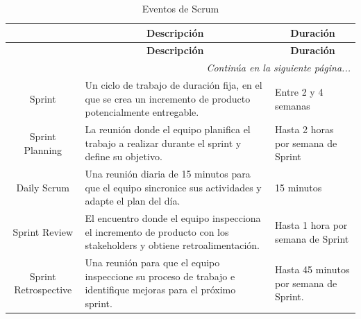 \begin{longtable}[c]{|c|m{}|m{}|}
    \caption{Eventos de Scrum}
    \label{tab:eventos} \\
    \hline
    \rowcolor{gray!50}
    \multicolumn{1}{|c|}{\textbf{Evento}} & \multicolumn{1}{c|}{\textbf{Descripción}} & \multicolumn{1}{c|}{\textbf{Duración}} \\
    \hline
    \endfirsthead

    \hline
    \rowcolor{gray!50}
    \multicolumn{1}{|c|}{\textbf{Evento}} & \multicolumn{1}{c|}{\textbf{Descripción}} & \multicolumn{1}{c|}{\textbf{Duración}} \\
    \hline
    \endhead

    \multicolumn{3}{r}{\textit{Continúa en la siguiente página...}} \\
    \endfoot

    \endlastfoot


    Sprint & Un ciclo de trabajo de duración fija, en el que se crea un incremento de producto potencialmente entregable. & Entre 2 y 4 semanas \\
    \hline
    Sprint Planning & La reunión donde el equipo planifica el trabajo a realizar durante el sprint y define su objetivo. & Hasta 2 horas por semana de Sprint \\
    \hline
    Daily Scrum & Una reunión diaria de 15 minutos para que el equipo sincronice sus actividades y adapte el plan del día. & 15 minutos \\
    \hline
    Sprint Review & El encuentro donde el equipo inspecciona el incremento de producto con los stakeholders y obtiene retroalimentación. & Hasta 1 hora por semana de Sprint \\
    \hline
    Sprint Retrospective & Una reunión para que el equipo inspeccione su proceso de trabajo e identifique mejoras para el próximo sprint. & Hasta 45 minutos por semana de Sprint. \\
    \hline

\end{longtable}